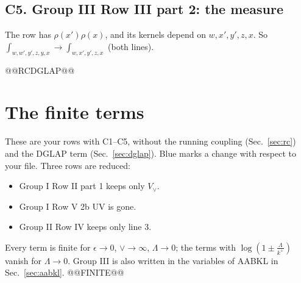 \documentclass[9pt]{article}
\numberwithin{equation}{section}
\begin{document}
\subsection*{C5. Group III Row III part 2: the measure}
The row has $\rho(x')\rho(x)$, and its kernels depend on $w,x',y',z,x$. So $\int_{w,w',y',z,y,x}\to\int_{w,x',y',z,x}$ (both lines).

@@RCDGLAP@@

\section{The finite terms}\label{sec:fin}
These are your rows with C1--C5, without the running coupling (Sec.~\ref{sec:rc}) and the DGLAP term (Sec.~\ref{sec:dglap}). Blue marks a change with respect to your file. Three rows are reduced:
\begin{itemize}
\item Group I Row II part 1 keeps only $V_\vee$.
\item Group I Row V 2b UV is gone.
\item Group II Row IV keeps only line 3.
\end{itemize}
Every term is finite for $\epsilon\to0$, $\vee\to\infty$, $\Lambda\to0$; the terms with $\log(1\pm\frac{\Lambda}{k^+})$ vanish for $\Lambda\to0$. Group III is also written in the variables of AABKL in Sec.~\ref{sec:aabkl}.
@@FINITE@@

\end{document}

